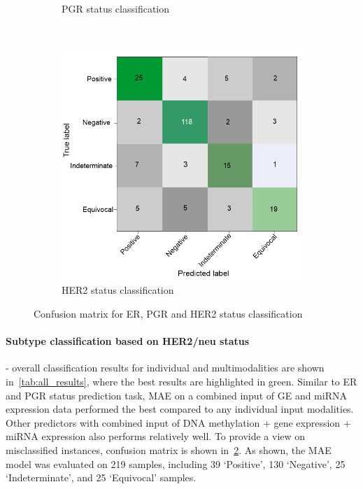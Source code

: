 \begin{figure}[h]
\begin{subfigure}{.49\linewidth}
		\caption{PGR status classification}
        \label{fig:pgr_confusion}
	\end{subfigure}\\[1ex]
	\begin{subfigure}{0.49\linewidth}
		\centering
		\includegraphics[scale=0.8]{images/conf_her2.png}
		\caption{HER2 status classification }
        \label{fig:her2_confusion}
	\end{subfigure}
	\caption{Confusion matrix for ER, PGR and HER2 status classification~\cite{karimACCESS2019}} 
	\label{fig:multi_cms}
\end{figure}

\paragraph{Subtype classification based on HER2/neu status} - overall classification results for individual and multimodalities are shown in~\cref{tab:all_results}, where the best results are highlighted in green. Similar to ER and PGR status prediction task, MAE on a combined input of GE and miRNA expression data performed the best compared to any individual input modalities. Other predictors with combined input of DNA methylation + gene expression + miRNA expression also performs relatively well. To provide a view on misclassified instances, confusion matrix is shown in~\cref{fig:her2_confusion}. As shown, the MAE model was evaluated on 219 samples, including 39 `Positive', 130 `Negative', 25  `Indeterminate', and 25 `Equivocal' samples. 

